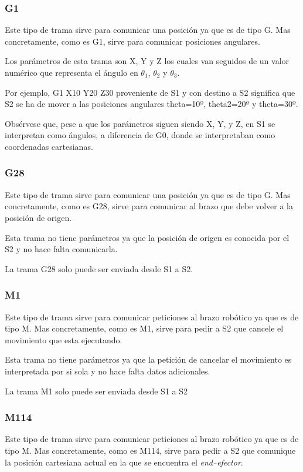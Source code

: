 \subsubsection{G1}
Este tipo de trama sirve para comunicar una posición ya que es de tipo G. Mas concretamente, como es G1, sirve para comunicar posiciones angulares.

Los parámetros de esta trama son X, Y y Z los cuales van seguidos de un valor numérico que representa el ángulo en $\theta_{1}$, $\theta_{2}$ y $\theta_{3}$.

Por ejemplo, G1 X10 Y20 Z30 proveniente de \ac{S1} y con destino a \ac{S2} significa que \ac{S2} se ha de mover a las posiciones angulares theta=10º, theta2=20º y theta=30º.

Obsérvese que, pese a que los parámetros siguen siendo X, Y, y Z, en S1 se interpretan como ángulos, a diferencia de G0, donde se interpretaban como coordenadas cartesianas.

\subsubsection{G28}
Este tipo de trama sirve para comunicar una posición ya que es de tipo G. Mas concretamente, como es G28, sirve para comunicar al brazo que debe volver a la posición de origen.

Esta trama no tiene parámetros ya que la posición de origen es conocida por el \ac{S2} y no hace falta comunicarla.

La trama G28 solo puede ser enviada desde \ac{S1} a \ac{S2}.

\subsubsection{M1}
Este tipo de trama sirve para comunicar peticiones al brazo robótico ya que es de tipo M. Mas concretamente, como es M1, sirve para pedir a \ac{S2} que cancele el movimiento que esta ejecutando.

Esta trama no tiene parámetros ya que la petición de cancelar el movimiento es interpretada por si sola y no hace falta datos adicionales.

La trama M1 solo puede ser enviada desde \ac{S1} a \ac{S2}

\subsubsection{M114}
Este tipo de trama sirve para comunicar peticiones al brazo robótico ya que es de tipo M. Mas concretamente, como es M114,
sirve para pedir a \ac{S2} que comunique la posición cartesiana actual en la que se encuentra el \textit{end--efector}.

